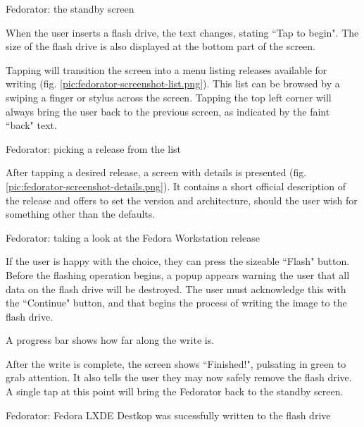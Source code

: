                 {Fedorator: the standby screen}
            
            When the user inserts a flash drive, the text changes, stating ``Tap to begin".  The size of the flash drive is also displayed at the bottom part of the screen.
            
            Tapping will transition the screen into a menu listing releases available for writing (fig. \ref{pic:fedorator-screenshot-list.png}).  This list can be browsed by a swiping a finger or stylus across the screen.  Tapping the top left corner will always bring the user back to the previous screen, as indicated by the faint ``back" text. 
            
                {Fedorator: picking a release from the list}
            
            After tapping a desired release, a screen with details is presented (fig. \ref{pic:fedorator-screenshot-details.png}).  It contains a short official description of the release and offers to set the version and architecture, should the user wish for something other than the defaults.
            
                {Fedorator: taking a look at the Fedora Workstation release}
            
            If the user is happy with the choice, they can press the sizeable ``Flash" button.  Before the flashing operation begins, a popup appears warning the user that all data on the flash drive will be destroyed.  The user must acknowledge this with the ``Continue" button, and that begins the process of writing the image to the flash drive.
            
            
            A progress bar shows how far along the write is.
            
            After the write is complete, the screen shows ``Finished!", pulsating in green to grab attention.  It also tells the user they may now safely remove the flash drive.  A single tap at this point will bring the Fedorator back to the standby screen.
            
                {Fedorator: Fedora LXDE Destkop was sucessfully written to the flash drive}
            
